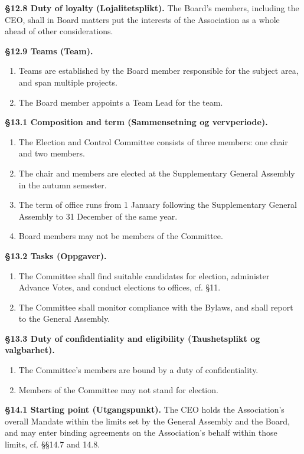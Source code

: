 \documentclass{../../../Common/Latex/Templates/rapport}
\begin{document}
\textbf{\S 12.8 Duty of loyalty (Lojalitetsplikt).} The Board's members, including the CEO, shall in Board matters put the interests of the Association as a whole ahead of other considerations.

\textbf{\S 12.9 Teams (Team).}
\begin{enumerate}
  \item Teams are established by the Board member responsible for the subject area, and span multiple projects.
  \item The Board member appoints a Team Lead for the team.
\end{enumerate}

\textbf{\S 13.1 Composition and term (Sammensetning og vervperiode).}
\begin{enumerate}
  \item The Election and Control Committee consists of three members: one chair and two members.
  \item The chair and members are elected at the Supplementary General Assembly in the autumn semester.
  \item The term of office runs from 1 January following the Supplementary General Assembly to 31 December of the same year.
  \item Board members may not be members of the Committee.
\end{enumerate}

\textbf{\S 13.2 Tasks (Oppgaver).}
\begin{enumerate}
  \item The Committee shall find suitable candidates for election, administer Advance Votes, and conduct elections to offices, cf. \S11.
  \item The Committee shall monitor compliance with the Bylaws, and shall report to the General Assembly.
\end{enumerate}

\textbf{\S 13.3 Duty of confidentiality and eligibility (Taushetsplikt og valgbarhet).}
\begin{enumerate}
  \item The Committee's members are bound by a duty of confidentiality.
  \item Members of the Committee may not stand for election.
\end{enumerate}


\textbf{\S 14.1 Starting point (Utgangspunkt).} The CEO holds the Association's overall Mandate within the limits set by the General Assembly and the Board, and may enter binding agreements on the Association's behalf within those limits, cf. \S\S14.7 and 14.8.
\end{document}
